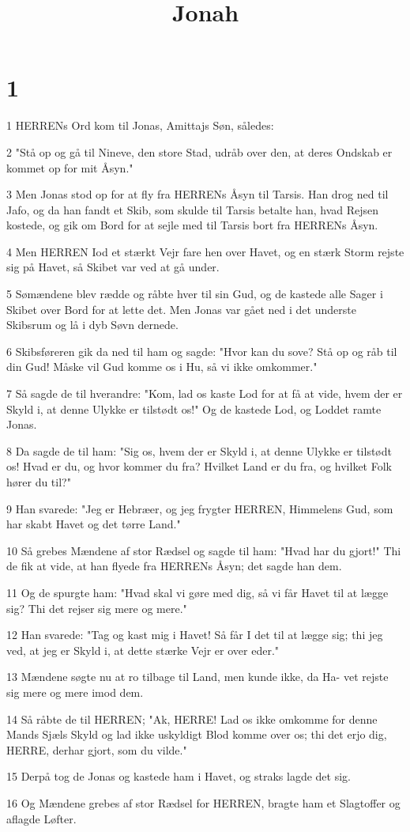 

\title{Jonah}


\chapter{1}

\par 1 HERRENs Ord kom til Jonas, Amittajs Søn, således:
\par 2 "Stå op og gå til Nineve, den store Stad, udråb over den, at deres Ondskab er kommet op for mit Åsyn."
\par 3 Men Jonas stod op for at fly fra HERRENs Åsyn til Tarsis. Han drog ned til Jafo, og da han fandt et Skib, som skulde til Tarsis betalte han, hvad Rejsen kostede, og gik om Bord for at sejle med til Tarsis bort fra HERRENs Åsyn.
\par 4 Men HERREN Iod et stærkt Vejr fare hen over Havet, og en stærk Storm rejste sig på Havet, så Skibet var ved at gå under.
\par 5 Sømændene blev rædde og råbte hver til sin Gud, og de kastede alle Sager i Skibet over Bord for at lette det. Men Jonas var gået ned i det underste Skibsrum og lå i dyb Søvn dernede.
\par 6 Skibsføreren gik da ned til ham og sagde: "Hvor kan du sove? Stå op og råb til din Gud! Måske vil Gud komme os i Hu, så vi ikke omkommer."
\par 7 Så sagde de til hverandre: "Kom, lad os kaste Lod for at få at vide, hvem der er Skyld i, at denne Ulykke er tilstødt os!" Og de kastede Lod, og Loddet ramte Jonas.
\par 8 Da sagde de til ham: "Sig os, hvem der er Skyld i, at denne Ulykke er tilstødt os! Hvad er du, og hvor kommer du fra? Hvilket Land er du fra, og hvilket Folk hører du til?"
\par 9 Han svarede: "Jeg er Hebræer, og jeg frygter HERREN, Himmelens Gud, som har skabt Havet og det tørre Land."
\par 10 Så grebes Mændene af stor Rædsel og sagde til ham: "Hvad har du gjort!" Thi de fik at vide, at han flyede fra HERRENs Åsyn; det sagde han dem.
\par 11 Og de spurgte ham: "Hvad skal vi gøre med dig, så vi får Havet til at lægge sig? Thi det rejser sig mere og mere."
\par 12 Han svarede: "Tag og kast mig i Havet! Så får I det til at lægge sig; thi jeg ved, at jeg er Skyld i, at dette stærke Vejr er over eder."
\par 13 Mændene søgte nu at ro tilbage til Land, men kunde ikke, da Ha- vet rejste sig mere og mere imod dem.
\par 14 Så råbte de til HERREN; "Ak, HERRE! Lad os ikke omkomme for denne Mands Sjæls Skyld og lad ikke uskyldigt Blod komme over os; thi det erjo dig, HERRE, derhar gjort, som du vilde."
\par 15 Derpå tog de Jonas og kastede ham i Havet, og straks lagde det sig.
\par 16 Og Mændene grebes af stor Rædsel for HERREN, bragte ham et Slagtoffer og aflagde Løfter.


